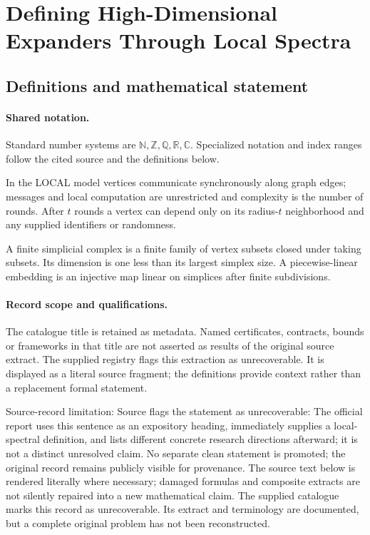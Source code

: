 \documentclass[11pt]{article}
\begin{document}
\section{Defining High-Dimensional Expanders Through Local Spectra}\label{statement}

\subsection{Definitions and mathematical statement}

\paragraph{Shared notation.}Standard number systems are $\mathbb N,\mathbb Z,\mathbb Q,\mathbb R,\mathbb C$. Specialized notation and index ranges follow the cited source and the definitions below.


In the LOCAL model vertices communicate synchronously along graph edges; messages and local computation are unrestricted and complexity is the number of rounds. After $t$ rounds a vertex can depend only on its radius-$t$ neighborhood and any supplied identifiers or randomness.

A finite simplicial complex is a finite family of vertex subsets closed under taking subsets. Its dimension is one less than its largest simplex size. A piecewise-linear embedding is an injective map linear on simplices after finite subdivisions.
\paragraph{Record scope and qualifications.}
The catalogue title is retained as metadata. Named certificates, contracts, bounds or frameworks in that title are not asserted as results of the original source extract.
The supplied registry flags this extraction as unrecoverable. It is displayed as a literal source fragment; the definitions provide context rather than a replacement formal statement.

Source-record limitation: Source flags the statement as unrecoverable: The official report uses this sentence as an expository heading, immediately supplies a local-spectral definition, and lists different concrete research directions afterward; it is not a distinct unresolved claim. No separate clean statement is promoted; the original record remains publicly visible for provenance.
The source text below is rendered literally where necessary; damaged formulas and composite extracts are not silently repaired into a new mathematical claim.
The supplied catalogue marks this record as unrecoverable. Its extract and terminology are documented, but a complete original problem has not been reconstructed.
\end{document}
